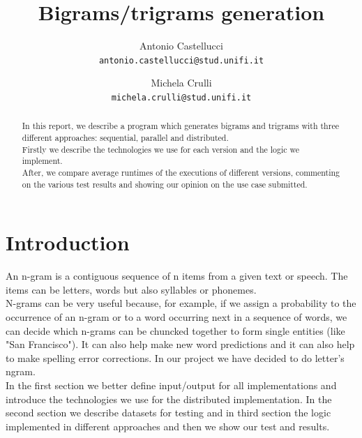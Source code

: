 \documentclass[10pt,twocolumn,letterpaper]{article}
\begin{document}
\title{Bigrams/trigrams generation}

\author{Antonio Castellucci\\
{\tt\small antonio.castellucci@stud.unifi.it}
\and
Michela Crulli\\
{\tt\small michela.crulli@stud.unifi.it}
}

\maketitle
\thispagestyle{empty}


\begin{abstract}
In this report, we describe a program which generates bigrams and trigrams with three different approaches: sequential, parallel and distributed.\\ 
Firstly we describe the technologies we use for each version and the logic we implement.\\
After, we compare average runtimes of the executions of different versions, commenting on the various test results and showing our opinion on the use case submitted.

\end{abstract}

\section{Introduction}
An n-gram is a contiguous sequence of n items from a given text or speech.
The items can be letters, words but also syllables or phonemes.\\
N-grams can be very useful because, for example, if we assign a probability to the occurrence of an n-gram or to a word occurring next in a sequence of words, we can decide which n-grams can be chuncked together to form single entities (like "San Francisco"). It can also help make new word predictions and it can also help to make spelling error corrections. In our project we have decided to do letter's ngram.\\
In the first section we better define input/output for all implementations and introduce the technologies we use for the distributed implementation.
In the second section we describe datasets for testing and in third section the logic implemented in different approaches and then we show our test and results.
\end{document}

